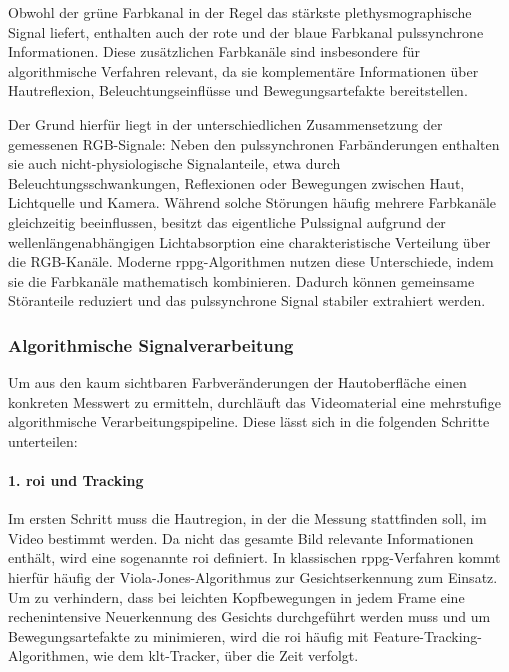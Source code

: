 Obwohl der grüne Farbkanal in der Regel das stärkste plethysmographische Signal liefert, enthalten auch der rote und der blaue Farbkanal pulssynchrone Informationen. Diese zusätzlichen Farbkanäle sind insbesondere für algorithmische Verfahren relevant, da sie komplementäre Informationen über Hautreflexion, Beleuchtungseinflüsse und Bewegungsartefakte bereitstellen.

Der Grund hierfür liegt in der unterschiedlichen Zusammensetzung der gemessenen RGB-Signale: Neben den pulssynchronen Farbänderungen enthalten sie auch nicht-physiolo\allowbreak gi\allowbreak sche Signalanteile, etwa durch Beleuchtungsschwankungen, Reflexionen oder Bewegungen zwischen Haut, Lichtquelle und Kamera. Während solche Störungen häufig mehrere Farbkanäle gleichzeitig beeinflussen, besitzt das eigentliche Pulssignal aufgrund der wellenlängenabhängigen Lichtabsorption eine charakteristische Verteilung über die RGB-Kanäle. Moderne \ac{rppg}-Algorithmen nutzen diese Unterschiede, indem sie die Farbkanäle mathematisch kombinieren. Dadurch können gemeinsame Störanteile reduziert und das pulssynchrone Signal stabiler extrahiert werden.

\subsubsection{Algorithmische Signalverarbeitung}

Um aus den kaum sichtbaren Farbveränderungen der Hautoberfläche einen konkreten Messwert zu ermitteln, durchläuft das Videomaterial eine mehrstufige algorithmische Verarbeitungspipeline. Diese lässt sich in die folgenden Schritte unterteilen:

\paragraph{1. \ac{roi} und Tracking}
Im ersten Schritt muss die Hautregion, in der die Messung stattfinden soll, im Video bestimmt werden. Da nicht das gesamte Bild relevante Informationen enthält, wird eine sogenannte \ac{roi} definiert. In klassischen \ac{rppg}-Verfahren kommt hierfür häufig der Viola-Jones-Algorithmus zur Gesichtserkennung zum Einsatz. Um zu verhindern, dass bei leichten Kopfbewegungen in jedem Frame eine rechenintensive Neuerkennung des Gesichts durchgeführt werden muss und um Bewegungsartefakte zu minimieren, wird die \ac{roi} häufig mit Feature-Tracking-Algorithmen, wie dem \ac{klt}-Tracker, über die Zeit verfolgt.

